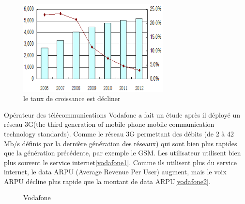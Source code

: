       \begin{figure}[H]
          \centering
          \includegraphics[width=3in]{images/1.png}
          \caption{le taux de croissance est décliner}
          \label{tauxdecroissance}
      \end{figure}
Opérateur des télécommunications Vodafone a fait un étude après il déployé un réseau 3G(\textsf{the third generation of mobile phone mobile communication technology standards}). Comme le réseau 3G permettant des débits (de 2 à 42 Mb/s définis par la dernière génération des réseaux) qui sont bien plus rapides que la génération précédente, par exemple le GSM. Les utilisateur utilisent bien plus souvent le service internet\ref{vodafone1}. Comme ils utilisent plus du service internet, le data ARPU (Average Revenue Per User) augment, mais le voix ARPU décline plus rapide que la montant de data ARPU\ref{vodafone2}. 
 \begin{figure}[H]
 	\flushleft
 	 	\hfill
 	\hspace{1in}	 
 	\caption{Vodafone} 
 \end{figure}
 
